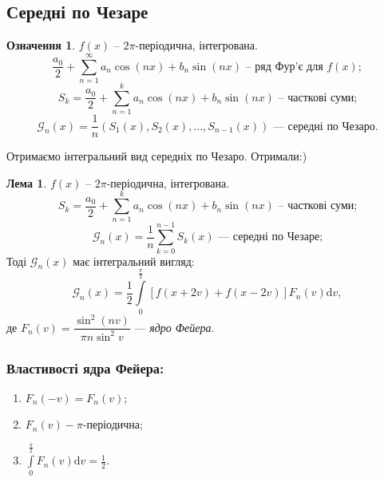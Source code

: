 \documentclass[a4paper]{scrartcl}
\theoremstyle{definition}
\newtheorem*{defo}{Означення}
\newtheorem*{lemme}{Лема}
\theoremstyle{remark}
\theoremstyle{definition}
\theoremstyle{definition}
\begin{document}
\subsection{Середні по Чезаре}
\begin{defo}
$f(x)$ -- $2\pi$-періодична, інтегрована.
$$
\frac{a_0}{2} +  \sum\limits_{n =1}^{\infty}{ a_n\cos{(nx)} + b_n \sin{(nx)}} \text{ -- ряд Фур'є для } f(x);
$$
$$
S_k = \frac{a_0}{2} +  \sum\limits_{n =1}^{k}{ a_n\cos{(nx)} + b_n \sin{(nx)}} \text{ -- часткові суми;}
$$
$$
\mathcal{G}_n(x) = \frac{1}{n}(S_1(x), S_2(x), \dots, S_{n-1}(x)) \textit{ --- середні по Чезаро.}
$$
\end{defo}
Отримаємо інтегральний вид середніх по Чезаро. Отримали:)
\begin{lemme} $f(x)$ -- $2\pi$-періодична, інтегрована.
  $$
  S_k = \frac{a_0}{2} +  \sum\limits_{n =1}^{k}{ a_n\cos{(nx)} + b_n \sin{(nx)}} \text{ -- часткові суми;}
  $$
  $$
  \mathcal{G}_n(x) = \frac{1}{n}  \sum\limits_{k = 0}^{n-1}{ S_k (x)}  \text{ --- середні по Чезаре;}
  $$
  Тоді  $\mathcal{G}_n(x) $ має інтегральний вигляд:
  $$
  \mathcal{G}_n(x) = \frac{1}{2} \int\limits_{0}^{ \frac{\pi}{2} }{ \left[ f(x  + 2 v) + f(x - 2v) \right] F_n(v) \mathrm{d} v} ,
  $$
 де $F_n (v) = \dfrac{\sin^2 (nv)}{\pi n \sin^2 v} $ --- \textit{ядро Фейера}.
\end{lemme}
\newpage
\subsubsection*{Властивості ядра Фейера:}
\begin{enumerate}
  \item $F_n (-v) = F_n (v)$;
  \item $F_n (v) - \pi$-періодична;
  \item $\displaystyle \int\limits_{0}^{ \frac{\pi}{2}}{F_n (v) \mathrm{d} v} = \frac{1}{2} $.
\end{enumerate}
\end{document}
